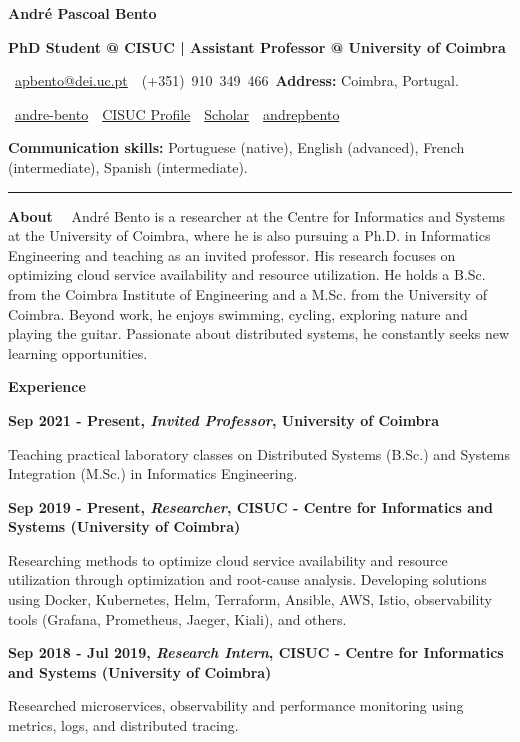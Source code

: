 \documentclass[a4paper,9pt]{memoir}
\newcommand{\cvheading}[1]{{\large\bfseries\color{RoyalBlue} #1}} %
\newcommand{\cvsubheading}[1]{{\Large\bfseries #1} \bigbreak} %
\newcommand{\Sep}{\vspace{1em}} %
\newcommand{\SmallSep}{\vspace{0.5em}} %
\newcommand{\aboutme}[2]{ %
    \textbf{\color{RoyalBlue} #1}~~#2\par\Sep
}
\newcommand{\CVSection}[1]{ %
    {\Large\textbf{#1}}\par
    \SmallSep %
}
\newcommand{\CVItem}[2]{ %
    \textbf{\color{RoyalBlue} #1}\par
    #2
    \SmallSep %
}
\begin{document}
\begin{center}
    \cvheading{\textbf{André Pascoal Bento}}

    \cvsubheading{\Large PhD Student @ CISUC | Assistant Professor @ University of Coimbra}
    
    \faEnvelope~\href{mailto:apbento@dei.uc.pt}{apbento@dei.uc.pt}\
    \faPhone~(+351)~910~349~466\ 
    \textbf{Address:} Coimbra, Portugal.

    \faLinkedin~\href{https://www.linkedin.com/in/andre-bento/?locale=en_US}{andre-bento}\
    \faGlobe~\href{https://www.cisuc.uc.pt/en/people/apbento}{CISUC Profile}\
    \faGoogle~\href{https://scholar.google.com/citations?user=9Yl9gBwAAAAJ&hl=en}{Scholar}\
    \faGithub~\href{https://github.com/andrepbento}{andrepbento}

    \textbf{Communication skills:}
    Portuguese (native),
    English (advanced),
    French (intermediate),
    Spanish (intermediate).
    
    \noindent\rule{\linewidth}{0.4pt}
\end{center}


\aboutme{About}{
André Bento is a researcher at the Centre for Informatics and Systems at the University of Coimbra, where he is also pursuing a Ph.D. in Informatics Engineering and teaching as an invited professor. His research focuses on optimizing cloud service availability and resource utilization.
%
He holds a B.Sc. from the Coimbra Institute of Engineering and a M.Sc. from the University of Coimbra. Beyond work, he enjoys swimming, cycling, exploring nature and playing the guitar. Passionate about distributed systems, he constantly seeks new learning opportunities.
}

\CVSection{Experience}

\CVItem{Sep 2021 - Present, \textit{Invited Professor}, University of Coimbra}{
    Teaching practical laboratory classes on Distributed Systems (B.Sc.) and Systems Integration (M.Sc.) in Informatics Engineering.
}

\CVItem{Sep 2019 - Present, \textit{Researcher}, CISUC - Centre for Informatics and Systems (University of Coimbra)}{
    Researching methods to optimize cloud service availability and resource utilization through optimization and root-cause analysis.
    Developing solutions using Docker, Kubernetes, Helm, Terraform, Ansible, AWS, Istio, observability tools (Grafana, Prometheus, Jaeger, Kiali), and others.
}

\CVItem{Sep 2018 - Jul 2019, \textit{Research Intern}, CISUC - Centre for Informatics and Systems (University of Coimbra)}{
    Researched microservices, observability and performance monitoring using metrics, logs, and distributed tracing.
}
\end{document}
